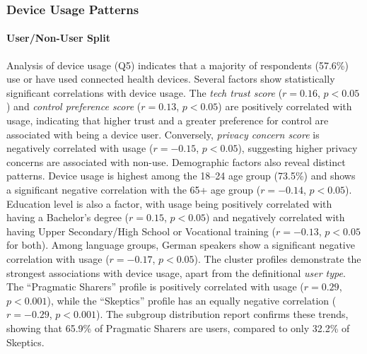 	\subsubsection{Device Usage Patterns}

	\paragraph{User/Non-User Split}
	Analysis of device usage (Q5) indicates that a majority of respondents (57.6\%) use or have used connected health devices.
	Several factors show statistically significant correlations with device usage. The \textit{tech trust score} ($r = 0.16$, $p < 0.05$) and \textit{control preference score} ($r = 0.13$, $p < 0.05$) are positively correlated with usage, indicating that higher trust and a greater preference for control are associated with being a device user. Conversely, \textit{privacy concern score} is negatively correlated with usage ($r = -0.15$, $p < 0.05$), suggesting higher privacy concerns are associated with non-use.
	Demographic factors also reveal distinct patterns. Device usage is highest among the 18--24 age group (73.5\%) and shows a significant negative correlation with the 65+ age group ($r = -0.14$, $p < 0.05$). Education level is also a factor, with usage being positively correlated with having a Bachelor's degree ($r = 0.15$, $p < 0.05$) and negatively correlated with having Upper Secondary/High School or Vocational training ($r = -0.13$, $p < 0.05$ for both). Among language groups, German speakers show a significant negative correlation with usage ($r = -0.17$, $p < 0.05$).
	The cluster profiles demonstrate the strongest associations with device usage, apart from the definitional \textit{user type}. The ``Pragmatic Sharers'' profile is positively correlated with usage ($r = 0.29$, $p < 0.001$), while the ``Skeptics'' profile has an equally negative correlation ($r = -0.29$, $p < 0.001$). The subgroup distribution report confirms these trends, showing that 65.9\% of Pragmatic Sharers are users, compared to only 32.2\% of Skeptics.

